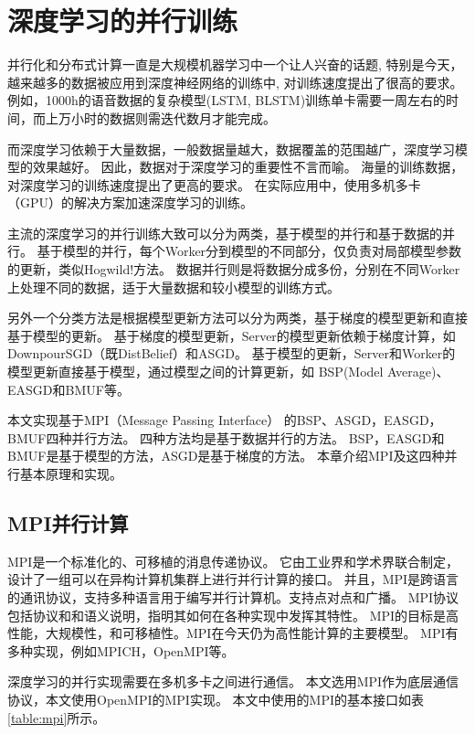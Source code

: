 ﻿%
\chapter{深度学习的并行训练}

并行化和分布式计算一直是大规模机器学习中一个让人兴奋的话题, 特别是今天，越来越多的数据被应用到深度神经网络的训练中, 对训练速度提出了很高的要求。
例如，1000h的语音数据的复杂模型(LSTM, BLSTM)训练单卡需要一周左右的时间，而上万小时的数据则需迭代数月才能完成。

而深度学习依赖于大量数据，一般数据量越大，数据覆盖的范围越广，深度学习模型的效果越好。
因此，数据对于深度学习的重要性不言而喻。
海量的训练数据，对深度学习的训练速度提出了更高的要求。
在实际应用中，使用多机多卡（GPU）的解决方案加速深度学习的训练。

主流的深度学习的并行训练大致可以分为两类，基于模型的并行和基于数据的并行。
基于模型的并行，每个Worker分到模型的不同部分，仅负责对局部模型参数的更新，类似Hogwild!方法。
数据并行则是将数据分成多份，分别在不同Worker上处理不同的数据，适于大量数据和较小模型的训练方式。

另外一个分类方法是根据模型更新方法可以分为两类，基于梯度的模型更新和直接基于模型的更新。
基于梯度的模型更新，Server的模型更新依赖于梯度计算，如DownpourSGD（既DistBelief）和ASGD。
基于模型的更新，Server和Worker的模型更新直接基于模型，通过模型之间的计算更新，如 BSP(Model Average)、EASGD和BMUF等。

本文实现基于MPI（Message Passing Interface） 的BSP、ASGD，EASGD，BMUF四种并行方法。
四种方法均是基于数据并行的方法。
BSP，EASGD和BMUF是基于模型的方法，ASGD是基于梯度的方法。
本章介绍MPI及这四种并行基本原理和实现。

\section{MPI并行计算}

MPI是一个标准化的、可移植的消息传递协议。
它由工业界和学术界联合制定，设计了一组可以在异构计算机集群上进行并行计算的接口。
并且，MPI是跨语言的通讯协议，支持多种语言用于编写并行计算机。支持点对点和广播。
MPI协议包括协议和和语义说明，指明其如何在各种实现中发挥其特性。
MPI的目标是高性能，大规模性，和可移植性。MPI在今天仍为高性能计算的主要模型。
MPI有多种实现，例如MPICH，OpenMPI等。

深度学习的并行实现需要在多机多卡之间进行通信。
本文选用MPI作为底层通信协议，本文使用OpenMPI的MPI实现。
本文中使用的MPI的基本接口如表\ref{table:mpi}所示。

